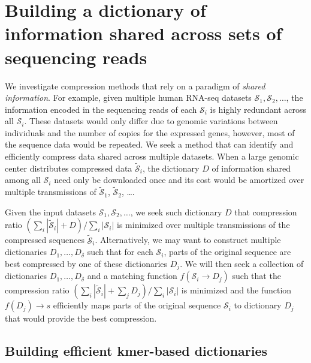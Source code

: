 \documentclass[12pt]{cmuthesis}
\begin{document}
\section{Building a dictionary of information shared across sets of sequencing reads}

  \newcommand{\seq}{\mathcal{S}\xspace}
  \newcommand{\compseq}{\widetilde{\mathcal{S}}\xspace}

  

  We investigate compression methods that rely on a paradigm of \textit{shared information}. For example, given multiple human RNA-seq datasets $\mathcal{ S}_1, \mathcal{ S}_2, \ldots$, the information encoded in the sequencing reads of each $\mathcal{ S}_i$ is highly redundant across all $\mathcal{S}_i$.  These datasets would only differ due to genomic variations between individuals and the number of copies for the expressed genes, however, most of the sequence data would be repeated. We seek a method that can identify and efficiently compress data shared across multiple datasets. When a large genomic center distributes compressed data $\mathcal{\widetilde S}_i$, the dictionary $D$ of information shared among all $\mathcal{S}_i$ need only be downloaded once and its cost would be amortized over multiple transmissions of $\mathcal{\widetilde S}_1$, $\mathcal{\widetilde S}_2$, \ldots.

  Given the input datasets $\mathcal{ S}_1, \mathcal{ S}_2, \ldots$, we seek such dictionary $D$ that compression ratio $(\sum_i |\compseq_i| + D) / \sum_i |\seq_i|$ is minimized over multiple transmissions of the compressed sequences $\compseq_i$. Alternatively, we may want to construct multiple dictionaries $D_1, \ldots, D_\delta$ such that for each $\seq_i$, parts of the original sequence are best compressed by one of these dictionaries $D_j$. We will then seek a collection of dictionaries $D_1, \ldots, D_\delta$ and a matching function $f(\seq_i \to D_j)$ such that the compression ratio $(\sum_i |\compseq_i| + \sum_j D_j) / \sum_i |\seq_i|$ is minimized and the function $f(D_j) \to s$ efficiently maps parts of the original sequence $\seq_i$ to dictionary $D_j$ that would provide the best compression.

\subsection{Building efficient kmer-based dictionaries}
\end{document}
